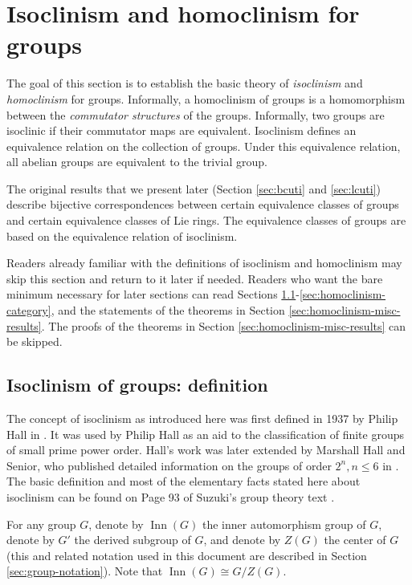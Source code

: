 \section{Isoclinism and homoclinism for groups}\label{sec:isoclinism-and-homoclinism}

The goal of this section is to establish the basic theory of {\em
  isoclinism} and {\em homoclinism} for groups. Informally, a
homoclinism of groups is a homomorphism between the {\em commutator
  structures} of the groups. Informally, two groups are isoclinic if
their commutator maps are equivalent. Isoclinism defines an
equivalence relation on the collection of groups. Under this
equivalence relation, all abelian groups are equivalent to the trivial
group.

The original results that we present later (Section \ref{sec:bcuti}
and \ref{sec:lcuti}) describe bijective correspondences between
certain equivalence classes of groups and certain equivalence classes
of Lie rings. The equivalence classes of groups are based on the
equivalence relation of isoclinism.

Readers already familiar with the definitions of isoclinism and
homoclinism may skip this section and return to it later if needed.
Readers who want the bare minimum necessary for later sections can
read Sections
\ref{sec:isoclinism-definition}-\ref{sec:homoclinism-category}, and
the statements of the theorems in Section
\ref{sec:homoclinism-misc-results}. The proofs of the theorems in
Section \ref{sec:homoclinism-misc-results} can be skipped.


\subsection{Isoclinism of groups: definition}\label{sec:isoclinism-definition}

The concept of isoclinism as introduced here was first defined in 1937
by Philip Hall in \cite{Hall37}. It was used by Philip Hall as an aid
to the classification of finite groups of small prime power
order. Hall's work was later extended by Marshall Hall and Senior, who
published detailed information on the groups of order $2^n, n \le 6$
in \cite{HallSenior}. The basic definition and most of the elementary
facts stated here about isoclinism can be found on Page 93 of Suzuki's
group theory text \cite{SuzukiII}.

For any group $G$, denote by $\operatorname{Inn}(G)$ the inner
automorphism group of $G$, denote by $G'$ the derived subgroup of $G$,
and denote by $Z(G)$ the center of $G$ (this and related notation used
in this document are described in Section \ref{sec:group-notation}). Note that $\operatorname{Inn}(G) \cong G/Z(G)$.


